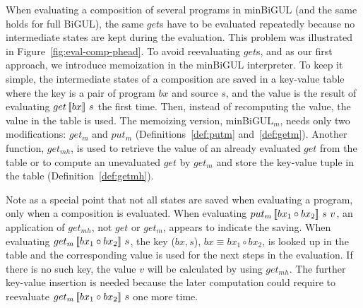 When evaluating a composition of several programs in minBiGUL (and the same holds for full BiGUL), the same $get$s have to be evaluated repeatedly because no intermediate states are kept during the evaluation. This problem was illustrated in Figure~\ref{fig:eval-comp-phead}. To avoid reevaluating $get$s, and as our first approach, we introduce memoization in the minBiGUL interpreter.
To keep it simple, the intermediate states of a composition are saved in a key-value table where the key is a pair of program $bx$ and source $s$, and the value is the result of evaluating $get \, [\![bx]\!] \ s$ the first time. Then, instead of recomputing the value, the value in the table is used. The memoizing version, minBiGUL$_m$, needs only two modifications: $get_m$ and $put_m$ (Definitions~\ref{def:putm} and~\ref{def:getm}). Another function, $get_{mh}$, is used to retrieve the value of an already evaluated $get$ from the table or to compute an unevaluated $get$ by $get_m$ and store the key-value tuple in the table (Definition~\ref{def:getmh}).

Note as a special point that not all states are saved when evaluating a program, only when a composition is evaluated. When evaluating $put_m \, [\![bx_1 \circ bx_2]\!] \ s \ v$, an application of $get_{mh}$, not $get$ or $get_m$, appears to indicate the saving. When evaluating $get_m \, [\![bx_1 \circ bx_2]\!] \ s$, the key ($bx,s$), $bx \equiv bx_1 \circ bx_2$, is looked up in the table and the corresponding value is used for the next steps in the evaluation. If there is no such key, the value $v$ will be calculated by using $get_{mh}$. The further key-value insertion is needed because the later computation could require to reevaluate $get_m \, [\![bx_1 \circ bx_2]\!] \ s$ one more time.
